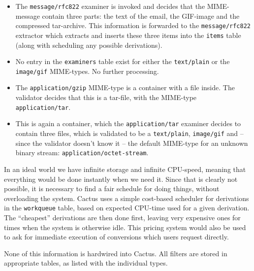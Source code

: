\begin{itemize}
\item The \texttt{message/rfc822} examiner is invoked and decides that
the MIME-message contain three parts: the text of the email, the
GIF-image and the compressed tar-archive.  This information is
forwarded to the \texttt{message/rfc822} extractor which extracts and
inserts these three items into the \texttt{items} table (along with
scheduling any possible derivations).

\item No entry in the \texttt{examiners} table exist for either the
\texttt{text/plain} or the \texttt{image/gif} MIME-types.  No further
processing.

\item The \texttt{application/gzip} MIME-type is a container with a
file inside.  The validator decides that this is a tar-file, with the
MIME-type \texttt{application/tar}.

\item This is again a container, which the \texttt{application/tar}
examiner decides to contain three files, which is validated to be a
\texttt{text/plain}, \texttt{image/gif} and -- since the validator
doesn't know it -- the default MIME-type for an unknown binary stream:
\texttt{application/octet-stream}.
\end{itemize}



In an ideal world we have infinite storage and infinite CPU-speed,
meaning that everything would be done instantly when we need it.
Since that is clearly not possible, it is necessary to find a fair
schedule for doing things, without overloading the system.  Cactus
uses a simple cost-based scheduler for derivations in the
\texttt{workqueue} table, based on expected CPU-time used for a given
derivation.  The ``cheapest'' derivations are then done first, leaving
very expensive ones for times when the system is otherwise idle.  This
pricing system would also be used to ask for immediate execution of
conversions which users request directly.


None of this information is hardwired into Cactus.  All
filters are stored in appropriate tables, as listed with the
individual types.


